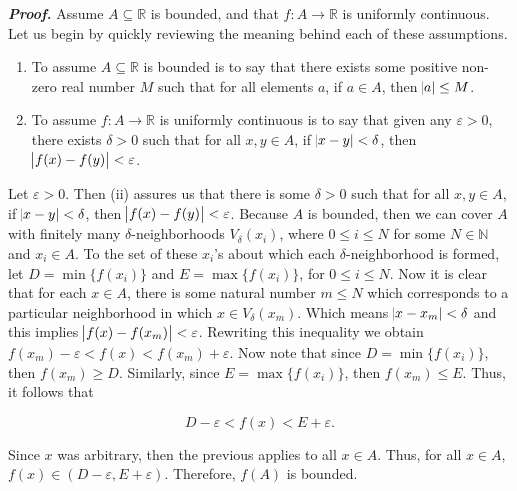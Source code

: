 \documentclass[12pt, a4paper]{article}
\begin{document}
\begin{description}
    \item\textit{\textbf{Proof.}} Assume $A\subseteq\mathbb{R}$ is bounded, and that $f\colon A\rightarrow\mathbb{R}$ is uniformly continuous. Let us begin by quickly reviewing the meaning behind each of these assumptions. 
    
    \begin{enumerate}[label=(\roman*)]
        \item To assume $A\subseteq\mathbb{R}$ is bounded is to say that there exists some positive non-zero real number $M$ such that for all elements $a$, if $a\in A$, then $\abs{a}\leq M$.
        
        \item To assume $f\colon A\rightarrow\mathbb{R}$ is uniformly continuous is to say that given any $\varepsilon>0$, there exists $\delta>0$ such that for all $x,y\in A$, if\hspace{1mm} $\abs{x-y}<\delta$, then $\abs{f(x)-f(y)}<\varepsilon$.     
    \end{enumerate}
    
    \item Let $\varepsilon>0$. Then (ii) assures us that there is some $\delta>0$ such that for all $x,y\in A$, if $\abs{x-y}<\delta$, then $\abs{f(x)-f(y)}<\varepsilon$. Because $A$ is bounded, then we can cover $A$ with finitely many $\delta$-neighborhoods $V_{\delta}(x_i)$, where $0\leq i\leq N$ for some $N\in\mathbb{N}$ and $x_i\in A$. To the set of these $x_i$'s about which each $\delta$-neighborhood is formed, let $D=\min\{f(x_i)\}$ and $E=\max\{f(x_i)\}$, for $0\leq i\leq N$. Now it is clear that for each $x\in A$, there is some natural number $m\leq N$ which corresponds to a particular neighborhood in which $x\in V_{\delta}(x_m)$. Which means $\abs{x-x_m}<\delta$ and this implies $\abs{f(x)-f(x_m)}<\varepsilon$. Rewriting this inequality we obtain $f(x_m)-\varepsilon<f(x)<f(x_m)+\varepsilon$. Now note that since $D=\min\{f(x_i)\}$, then $f(x_m)\geq D$. Similarly, since $E=\max\{f(x_i)\}$, then $f(x_m)\leq E$. Thus, it follows that
    
    \begin{equation*}
        D-\varepsilon<f(x)<E+\varepsilon.
    \end{equation*}
    
    \vspace{4mm}
    
    Since $x$ was arbitrary, then the previous applies to all $x\in A$. Thus, for all $x\in A$, $f(x)\in(D-\varepsilon,E+\varepsilon)$. Therefore, $f(A)$ is bounded.\hspace{51mm}\square
    
\end{description}
\end{document}
